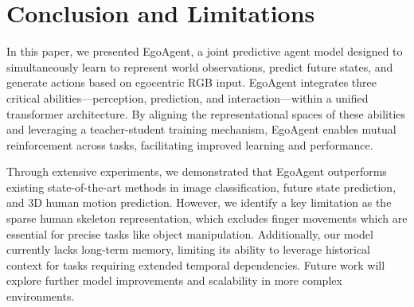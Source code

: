 \section{Conclusion and Limitations}
\label{sec:conclusion}
In this paper, we presented EgoAgent, a joint predictive agent model designed to simultaneously learn to represent world observations, predict future states, and generate actions based on egocentric RGB input. EgoAgent integrates three critical abilities—perception, prediction, and interaction—within a unified transformer architecture. By aligning the representational spaces of these abilities and leveraging a teacher-student training mechanism, EgoAgent enables mutual reinforcement across tasks, facilitating improved learning and performance.

Through extensive experiments, we demonstrated that EgoAgent outperforms existing state-of-the-art methods in image classification, future state prediction, and 3D human motion prediction. However, we identify a key limitation as the sparse human skeleton representation, which excludes finger movements which are essential for precise tasks like object manipulation. Additionally, our model currently lacks long-term memory, limiting its ability to leverage historical context for tasks requiring extended temporal dependencies. Future work will explore further model improvements and scalability in more complex environments.